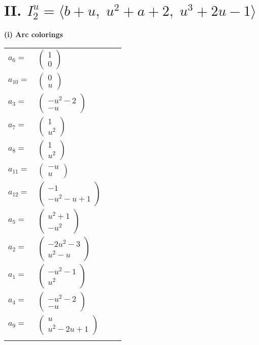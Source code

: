 \documentclass[1p]{elsarticle_modified}
\theoremstyle{definition}
\begin{document}
\centering \section*{II. $I^u_{2}= \langle b+u,\;u^2+a+2,\;u^3+2 u-1 \rangle$}
\flushleft \textbf{(i) Arc colorings}\\
\begin{tabular}{m{7pt} m{180pt} m{7pt} m{180pt} }
\flushright $a_{6}=$&$\begin{pmatrix}1\\0\end{pmatrix}$ \\
\flushright $a_{10}=$&$\begin{pmatrix}0\\u\end{pmatrix}$ \\
\flushright $a_{3}=$&$\begin{pmatrix}- u^2-2\\- u\end{pmatrix}$ \\
\flushright $a_{7}=$&$\begin{pmatrix}1\\u^2\end{pmatrix}$ \\
\flushright $a_{8}=$&$\begin{pmatrix}1\\u^2\end{pmatrix}$ \\
\flushright $a_{11}=$&$\begin{pmatrix}- u\\u\end{pmatrix}$ \\
\flushright $a_{12}=$&$\begin{pmatrix}-1\\- u^2- u+1\end{pmatrix}$ \\
\flushright $a_{5}=$&$\begin{pmatrix}u^2+1\\- u^2\end{pmatrix}$ \\
\flushright $a_{2}=$&$\begin{pmatrix}-2 u^2-3\\u^2- u\end{pmatrix}$ \\
\flushright $a_{1}=$&$\begin{pmatrix}- u^2-1\\u^2\end{pmatrix}$ \\
\flushright $a_{4}=$&$\begin{pmatrix}- u^2-2\\- u\end{pmatrix}$ \\
\flushright $a_{9}=$&$\begin{pmatrix}u\\u^2-2 u+1\end{pmatrix}$\\&\end{tabular}
\end{document}
